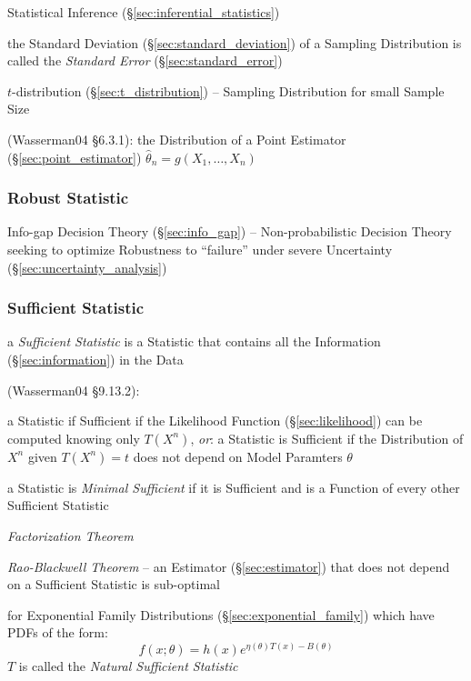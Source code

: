 Statistical Inference (\S\ref{sec:inferential_statistics})

the Standard Deviation (\S\ref{sec:standard_deviation}) of a Sampling
Distribution is called the \emph{Standard Error} (\S\ref{sec:standard_error})

$t$-distribution (\S\ref{sec:t_distribution}) -- Sampling Distribution for small
Sample Size

(Wasserman04 \S6.3.1):
the Distribution of a Point Estimator (\S\ref{sec:point_estimator})
$\hat{\theta}_n = g(X_1,\ldots,X_n)$



\subsubsection{Robust Statistic}\label{sec:robust_statistic}

\fist Info-gap Decision Theory (\S\ref{sec:info_gap}) -- Non-probabilistic
Decision Theory seeking to optimize Robustness to ``failure'' under severe
Uncertainty (\S\ref{sec:uncertainty_analysis})



\subsubsection{Sufficient Statistic}\label{sec:sufficient_statistic}

a \emph{Sufficient Statistic} is a Statistic that contains all the
Information (\S\ref{sec:information}) in the Data

(Wasserman04 \S9.13.2):

a Statistic if Sufficient if the Likelihood Function (\S\ref{sec:likelihood})
can be computed knowing only $T(X^n)$,
\emph{or}: a Statistic is Sufficient if the Distribution of $X^n$ given
$T(X^n) = t$ does not depend on Model Paramters $\theta$

a Statistic is \emph{Minimal Sufficient} if it is Sufficient and is a Function
of every other Sufficient Statistic

\emph{Factorization Theorem}

\emph{Rao-Blackwell Theorem} -- an Estimator (\S\ref{sec:estimator}) that does
not depend on a Sufficient Statistic is sub-optimal

for Exponential Family Distributions (\S\ref{sec:exponential_family}) which have
PDFs of the form:
\[
  f(x; \theta) = h(x) e^{\eta(\theta)T(x) - B(\theta)}
\]
$T$ is called the \emph{Natural Sufficient Statistic}



